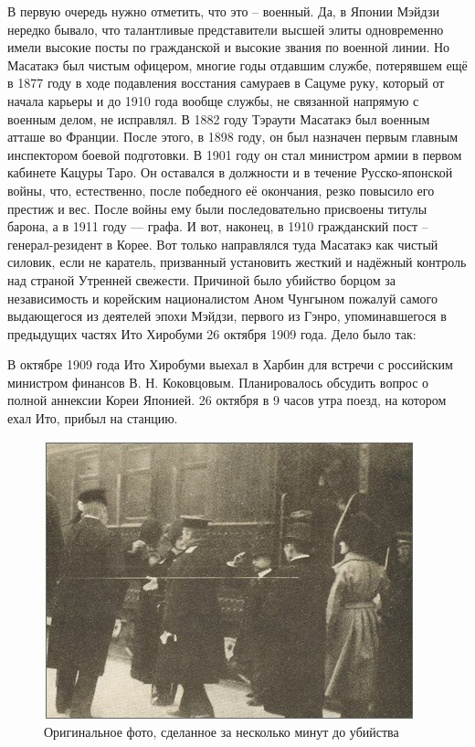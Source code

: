 В первую очередь нужно отметить, что это – военный. Да, в Японии Мэйдзи нередко бывало, что талантливые представители высшей элиты одновременно имели высокие посты по гражданской и высокие звания по военной линии. Но Масатакэ был чистым офицером, многие годы отдавшим службе, потерявшем ещё в 1877 году в ходе подавления восстания самураев в Сацуме руку, который от начала карьеры и до 1910 года вообще службы, не связанной напрямую с военным делом, не исправлял. В 1882 году Тэраути Масатакэ был военным атташе во Франции. После этого, в 1898 году, он был назначен первым главным инспектором боевой подготовки. В 1901 году он стал министром армии в первом кабинете Кацуры Таро. Он оставался в должности и в течение Русско-японской войны, что, естественно, после победного её окончания, резко повысило его престиж и вес. После войны ему были последовательно присвоены титулы барона, а в 1911 году — графа. И вот, наконец, в 1910 гражданский пост – генерал-резидент в Корее. Вот только направлялся туда Масатакэ как чистый силовик, если не каратель, призванный установить жесткий и надёжный контроль над страной Утренней свежести. Причиной было убийство борцом за независимость и корейским националистом Аном Чунгыном пожалуй самого выдающегося из деятелей эпохи Мэйдзи, первого из Гэнро, упоминавшегося в предыдущих частях Ито Хиробуми 26 октября 1909 года. Дело было так:

В октябре 1909 года Ито Хиробуми выехал в Харбин для встречи с российским министром финансов В. Н. Коковцовым. Планировалось обсудить вопрос о полной аннексии Кореи Японией. 26 октября в 9 часов утра поезд, на котором ехал Ито, прибыл на станцию. 

\begin{figure}[h!tb] 
	\centering\includegraphics[scale=0.6]{Glava4/VU6yNahIz7w.jpg}
	\caption{Оригинальное фото, сделанное за несколько минут до убийства}%
\end{figure}

